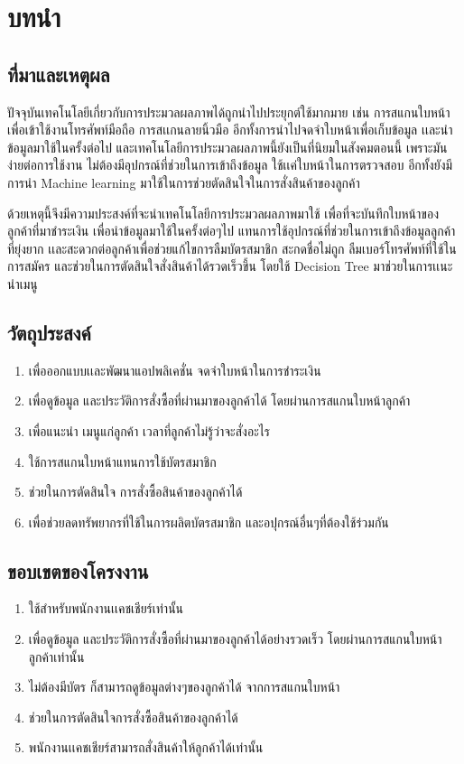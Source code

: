 \chapter{บทนำ}

\section{ที่มาและเหตุผล }
   ปัจจุบันเทคโนโลยีเกี่ยวกับการประมวลผลภาพได้ถูกนำไปประยุกต์ใช้มากมาย เช่น การสแกนใบหน้าเพื่อเข้าใช้งานโทรศัพท์มือถือ การสเเกนลายนิ้วมือ อีกทั้งการนำไปจดจำใบหน้าเพื่อเก็บข้อมูล เเละนำข้อมูลมาใช้ในครั้งต่อไป  และเทคโนโลยีการประมวลผลภาพนี้ยังเป็นที่นิยมในสังคมตอนนี้ เพราะมันง่ายต่อการใช้งาน ไม่ต้องมีอุปกรณ์ที่ช่วยในการเข้าถึงข้อมูล ใช้เเค่ใบหน้าในการตรวจสอบ  อีกทั้งยังมีการนำ Machine learning มาใช้ในการช่วยตัดสินใจในการสั่งสินค้าของลูกค้า  



ด้วยเหตุนี้จึงมีความประสงค์ที่จะนำเทคโนโลยีการประมวลผลภาพมาใช้ เพื่อที่จะบันทึกใบหน้าของลูกค้าที่มาชำระเงิน เพื่อนำข้อมูลมาใช้ในครั้งต่อๆไป แทนการใช้อุปกรณ์ที่ช่วยในการเข้าถึงข้อมูลลูกค้าที่ยุ่งยาก เเละสะดวกต่อลูกค้าเพื่อช่วยแก้ไขการลืมบัตรสมาชิก สะกดชื่อไม่ถูก ลืมเบอร์โทรศัพท์ที่ใช้ในการสมัคร  และช่วยในการตัดสินใจสั่งสินค้าได้รวดเร็วขึ้น โดยใช้ Decision Tree มาช่วยในการเเนะนำเมนู 


\section{วัตถุประสงค์}
\begin{enumerate}
	\item เพื่อออกแบบเเละพัฒนาแอปพลิเคชั่น จดจำใบหน้าในการชำระเงิน 
	\item  เพื่อดูข้อมูล และประวัติการสั่งซื้อที่ผ่านมาของลูกค้าได้ โดยผ่านการสแกนใบหน้าลูกค้า    
	\item เพื่อแนะนำ เมนูแก่ลูกค้า เวลาที่ลูกค้าไม่รู้ว่าจะสั่งอะไร 
	\item ใช้การสแกนใบหน้าแทนการใช้บัตรสมาชิก 
    \item ช่วยในการตัดสินใจ การสั่งซื้อสินค้าของลูกค้าได้     
    \item เพื่อช่วยลดทรัพยากรที่ใช้ในการผลิตบัตรสมาชิก และอปุกรณ์อื่นๆที่ต้องใช้ร่วมกัน
\end{enumerate}
\section{ขอบเขตของโครงงาน}
\begin{enumerate}
	\item ใช้สำหรับพนักงานเเคชเชียร์เท่านั้น
	\item เพื่อดูข้อมูล และประวัติการสั่งซื้อที่ผ่านมาของลูกค้าได้อย่างรวดเร็ว โดยผ่านการสแกนใบหน้าลูกค้าเท่านั้น
	\item ไม่ต้องมีบัตร ก็สามารถดูข้อมูลต่างๆของลูกค้าได้ จากการสแกนใบหน้า
    \item 	ช่วยในการตัดสินใจการสั่งซื้อสินค้าของลูกค้าได้ 
    \item พนักงานเเคชเชียร์สามารถสั่งสินค้าให้ลูกค้าได้เท่านั้น
		 \begin{itemize}
		 	
		 	
	
	\end{itemize}
\end{enumerate}
